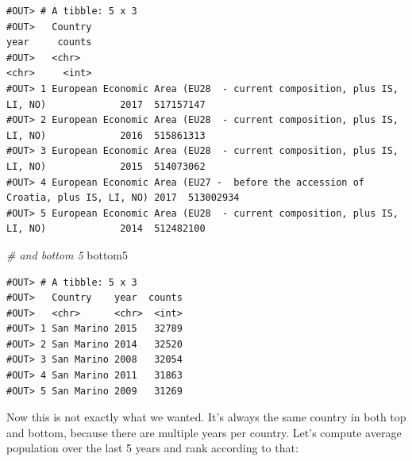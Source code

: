 \documentclass[]{book}
\newenvironment{Shaded}{\begin{snugshade}}{\end{snugshade}}
\newcommand{\CommentTok}[1]{\textcolor[rgb]{0.56,0.35,0.01}{\textit{#1}}}
\newcommand{\DataTypeTok}[1]{\textcolor[rgb]{0.13,0.29,0.53}{#1}}
\newcommand{\DecValTok}[1]{\textcolor[rgb]{0.00,0.00,0.81}{#1}}
\newcommand{\KeywordTok}[1]{\textcolor[rgb]{0.13,0.29,0.53}{\textbf{#1}}}
\newcommand{\NormalTok}[1]{#1}
\newcommand{\OperatorTok}[1]{\textcolor[rgb]{0.81,0.36,0.00}{\textbf{#1}}}
\newcommand{\StringTok}[1]{\textcolor[rgb]{0.31,0.60,0.02}{#1}}
\begin{document}
\begin{verbatim}
#OUT> # A tibble: 5 x 3
#OUT>   Country                                                                           year     counts
#OUT>   <chr>                                                                             <chr>     <int>
#OUT> 1 European Economic Area (EU28  - current composition, plus IS, LI, NO)             2017  517157147
#OUT> 2 European Economic Area (EU28  - current composition, plus IS, LI, NO)             2016  515861313
#OUT> 3 European Economic Area (EU28  - current composition, plus IS, LI, NO)             2015  514073062
#OUT> 4 European Economic Area (EU27 -  before the accession of Croatia, plus IS, LI, NO) 2017  513002934
#OUT> 5 European Economic Area (EU28  - current composition, plus IS, LI, NO)             2014  512482100
\end{verbatim}

\begin{Shaded}
\begin{Highlighting}[]
\CommentTok{# and bottom 5}
\NormalTok{bottom5}
\end{Highlighting}
\end{Shaded}

\begin{verbatim}
#OUT> # A tibble: 5 x 3
#OUT>   Country    year  counts
#OUT>   <chr>      <chr>  <int>
#OUT> 1 San Marino 2015   32789
#OUT> 2 San Marino 2014   32520
#OUT> 3 San Marino 2008   32054
#OUT> 4 San Marino 2011   31863
#OUT> 5 San Marino 2009   31269
\end{verbatim}

Now this is not exactly what we wanted. It's always the same country in both top and bottom, because there are multiple years per country. Let's compute average population over the last 5 years and rank according to that:

\begin{Shaded}
\end{Shaded}
\end{document}
